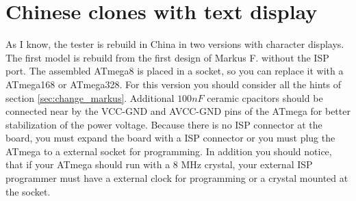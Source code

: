 \section{Chinese clones with text display}
As I know, the tester is rebuild in China in two versions with character displays.
The first model is rebuild from the first design of Markus F. without the ISP port.
The assembled ATmega8 is placed in a socket, so you can replace it with a ATmega168 or ATmega328.
For this version you should consider all the hints of section \ref{sec:change_markus}.
Additional \(100nF\) ceramic cpacitors should be connected near by the VCC-GND and AVCC-GND pins of
the ATmega for better stabilization of the power voltage.
Because there is no ISP connector at the board, you must expand the board with a ISP connector or you
must plug the ATmega to a external socket for programming.
In addition you should notice, that if your ATmega should run with a 8 MHz crystal,
your external ISP programmer must have a external clock for programming or a crystal mounted at the socket.\\

